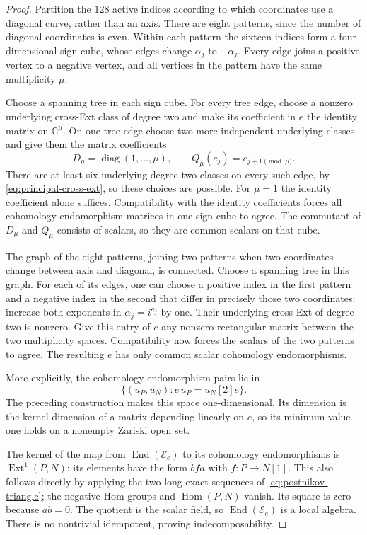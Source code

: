 \documentclass[11pt]{article}
\theoremstyle{definition}
\theoremstyle{remark}
\begin{document}
\begin{proof}
Partition the $128$ active indices according to which coordinates
use a diagonal curve, rather than an axis.  There are eight
patterns, since the number of diagonal coordinates is even.
Within each pattern the sixteen indices form a four-dimensional
sign cube, whose edges change $\alpha_j$ to $-\alpha_j$.
Every edge joins a positive vertex to a negative vertex, and all
vertices in the pattern have the same multiplicity $\mu$.

Choose a spanning tree in each sign cube.  For every tree edge,
choose a nonzero underlying cross-Ext class of degree two and
make its coefficient in $e$ the identity matrix on
$\mathbb C^\mu$.  On one tree edge choose two more independent
underlying classes and give them the matrix coefficients
\[
 D_\mu=\operatorname{diag}(1,\ldots,\mu),\qquad
 Q_\mu(e_j)=e_{j+1\pmod\mu}.
\]
There are at least six underlying degree-two classes on every
such edge, by \eqref{eq:principal-cross-ext}, so these choices
are possible.  For $\mu=1$ the identity coefficient alone
suffices.  Compatibility with the identity coefficients forces
all cohomology endomorphism matrices in one sign cube to agree.
The commutant of $D_\mu$ and $Q_\mu$ consists of scalars, so they
are common scalars on that cube.

The graph of the eight patterns, joining two patterns when two
coordinates change between axis and diagonal, is connected.
Choose a spanning tree in this graph.  For each of its edges,
one can choose a positive index in the first pattern and a
negative index in the second that differ in precisely those two
coordinates: increase both exponents in $\alpha_j=i^{a_j}$ by
one.  Their underlying cross-Ext of degree two is nonzero.
Give this entry of $e$ any nonzero rectangular matrix between
the two multiplicity spaces.  Compatibility now forces the
scalars of the two patterns to agree.  The resulting $e$ has
only common scalar cohomology endomorphisms.

More explicitly, the cohomology endomorphism pairs lie in
\[
 \{(u_P,u_N):e\,u_P=u_N[2]e\}.
\]
The preceding construction makes this space one-dimensional.
Its dimension is the kernel dimension of a matrix depending
linearly on $e$, so its minimum value one holds on a nonempty
Zariski open set.

The kernel of the map from
$\operatorname{End}(\mathcal E_e)$ to its cohomology
endomorphisms is $\operatorname{Ext}^1(P,N)$: its elements have
the form $bfa$ with $f:P\to N[1]$.  This also follows directly
by applying the two long exact sequences of
\eqref{eq:postnikov-triangle}; the negative Hom groups and
$\operatorname{Hom}(P,N)$ vanish.  Its square is zero because
$ab=0$.  The quotient is the scalar field, so
$\operatorname{End}(\mathcal E_e)$ is a local algebra.
There is no nontrivial idempotent, proving indecomposability.
\end{proof}
\end{document}
